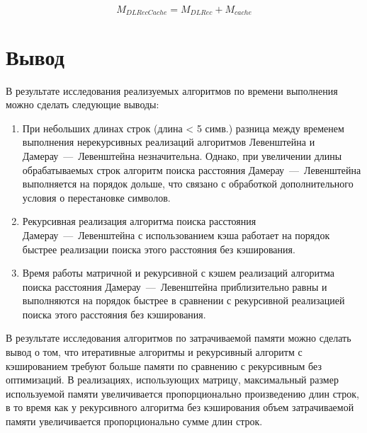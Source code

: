 \begin{equation}
    M_{DLRecCache} = M_{DLRec} + M_{cache}
\end{equation}

\section{Вывод}

В результате исследования реализуемых алгоритмов по времени выполнения можно сделать следующие выводы:

\begin{enumerate}
    \item При небольших длинах строк (длина < 5 симв.) разница между временем выполнения нерекурсивных реализаций алгоритмов Левенштейна и Дамерау~---~Левенштейна незначительна.
    Однако, при увеличении длины обрабатываемых строк алгоритм поиска расстояния Дамерау~---~Левенштейна выполняется на порядок дольше, что связано с обработкой дополнительного условия о перестановке символов.
    \item Рекурсивная реализация алгоритма поиска расстояния Дамерау~---~Левенштейна с использованием кэша работает на порядок быстрее реализации поиска этого расстояния без кэширования.
    \item Время работы матричной и рекурсивной с кэшем реализаций алгоритма поиска расстояния Дамерау~---~Левенштейна приблизительно равны и выполняются на порядок быстрее в сравнении с рекурсивной реализацией поиска этого расстояния без кэширования.
\end{enumerate}

В результате исследования алгоритмов по затрачиваемой памяти можно сделать вывод о том, что итеративные алгоритмы и рекурсивный алгоритм с кэшированием требуют больше памяти по сравнению с рекурсивным без оптимизаций.
В реализациях, использующих матрицу, максимальный размер используемой памяти увеличивается пропорционально произведению длин строк, в то время как у рекурсивного алгоритма без кэширования объем затрачиваемой памяти увеличивается пропорционально сумме длин строк.

